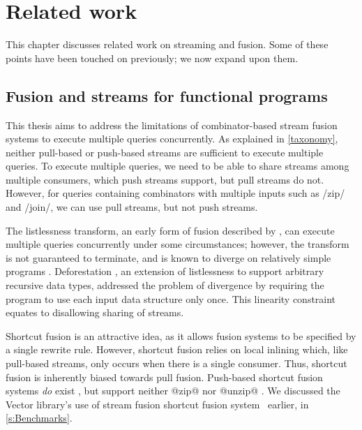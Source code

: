\chapter{Related work}
\label{related}

This chapter discusses related work on streaming and fusion.
Some of these points have been touched on previously; we now expand upon them.

\section{Fusion and streams for functional programs}
\label{related/fusion}
\label{related/stream-fusion}

This thesis aims to address the limitations of combinator-based stream fusion systems to execute multiple queries concurrently.
As explained in \cref{taxonomy}, neither pull-based or push-based streams are sufficient to execute multiple queries.
To execute multiple queries, we need to be able to share streams among multiple consumers, which push streams support, but pull streams do not.
However, for queries containing combinators with multiple inputs such as \Hs/zip/ and \Hs/join/, we can use pull streams, but not push streams.

The listlessness transform, an early form of fusion described by \citet{wadler1984listlessness}, can execute multiple queries concurrently under some circumstances; however, the transform is not guaranteed to terminate, and is known to diverge on relatively simple programs \citep{caspi1996synchronous}.
Deforestation \citep{wadler1990deforestation}, an extension of listlessness to support arbitrary recursive data types, addressed the problem of divergence by requiring the program to use each input data structure only once.
This linearity constraint equates to disallowing sharing of streams.

Shortcut fusion is an attractive idea, as it allows fusion systems to be specified by a single rewrite rule.
However, shortcut fusion relies on local inlining which, like pull-based streams, only occurs when there is a single consumer.
Thus, shortcut fusion is inherently biased towards pull fusion.
Push-based shortcut fusion systems \emph{do} exist \cite{gill1993short}, but support neither @zip@ nor @unzip@ \cite{svenningsson2002shortcut,lippmeier2013data}.
We discussed the Vector library's use of stream fusion shortcut fusion system~\cite{coutts2007stream} earlier, in \cref{s:Benchmarks}.

